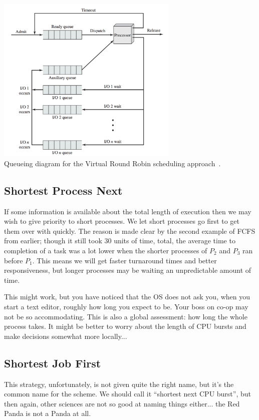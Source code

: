 \begin{center}
	\includegraphics[width=0.65\textwidth]{images/virtual-round-robin.png}\\
	Queueing diagram for the Virtual Round Robin scheduling approach~\cite{osi}.
\end{center}

\subsection*{Shortest Process Next}
If some information is available about the total length of execution then we may wish to give priority to short processes. We let short processes go first to get them over with quickly. The reason is made clear by the second example of FCFS from earlier; though it still took 30 units of time, total, the average time to completion of a task was a lot lower when the shorter processes of $P_{2}$ and $P_{3}$ ran before $P_{1}$. This means we will get faster turnaround times and better responsiveness, but longer processes may be waiting an unpredictable amount of time.

This might work, but you have noticed that the OS does not ask you, when you start a text editor, roughly how long you expect to be. Your boss on co-op may not be so accommodating. This is also a global assessment: how long the whole process takes. It might be better to worry about the length of CPU bursts and make decisions somewhat more locally...

\subsection*{Shortest Job First}
This strategy, unfortunately, is not given quite the right name, but it's the common name for the scheme. We should call it ``shortest next CPU burst'', but then again, other sciences are not so good at naming things either... the Red Panda is not a Panda at all.

